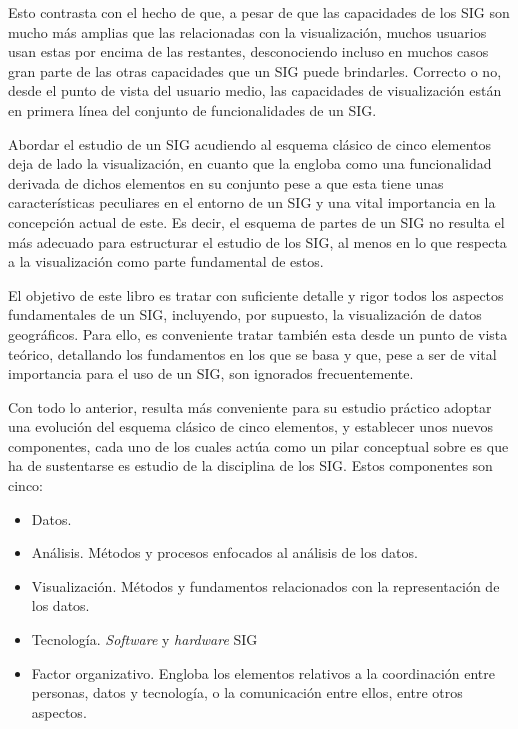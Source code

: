 Esto contrasta con el hecho de que, a pesar de que las capacidades de los SIG son mucho más amplias que las relacionadas con la visualización, muchos usuarios usan estas por encima de las restantes, desconociendo incluso en muchos casos gran parte de las otras capacidades que un SIG puede brindarles. Correcto o no, desde el punto de vista del usuario medio, las capacidades de visualización están en primera línea del conjunto de funcionalidades de un SIG.

Abordar el estudio de un SIG acudiendo al esquema clásico de cinco elementos deja de lado la visualización, en cuanto que la engloba como una funcionalidad derivada de dichos elementos en su conjunto pese a que esta tiene unas características peculiares en el entorno de un SIG y una vital importancia en la concepción actual de este. Es decir, el esquema de partes de un SIG no resulta el más adecuado para estructurar el estudio de los SIG, al menos en lo que respecta a la visualización como parte fundamental de estos.

El objetivo de este libro es tratar con suficiente detalle y rigor todos los aspectos fundamentales de un SIG, incluyendo, por supuesto, la visualización de datos geográficos. Para ello, es conveniente tratar también esta desde un punto de vista teórico, detallando los fundamentos en los que se basa y que, pese a ser de vital importancia para el uso de un SIG, son ignorados frecuentemente. 

Con todo lo anterior, resulta más conveniente para su estudio práctico adoptar una evolución del esquema clásico de cinco elementos, y establecer unos nuevos componentes, cada uno de los cuales actúa como un pilar conceptual sobre es que ha de sustentarse es estudio de la disciplina de los SIG. Estos componentes son cinco:

\begin{itemize}
 \item Datos.
\item Análisis. Métodos y procesos enfocados al análisis de los datos.
\item Visualización. Métodos y fundamentos relacionados con la representación de los datos. 
\item Tecnología. \emph{Software} y \emph{hardware} SIG
\item Factor organizativo. Engloba los elementos relativos a la coordinación entre personas, datos y tecnología, o la comunicación entre ellos, entre otros aspectos.
\end{itemize}

